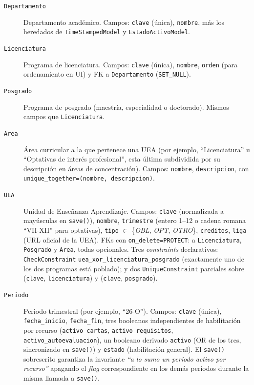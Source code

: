 \begin{description}
    \item[\texttt{Departamento}] Departamento académico. Campos: \texttt{clave} (única), \texttt{nombre}, más los heredados de \texttt{TimeStampedModel} y \texttt{EstadoActivoModel}.
    \item[\texttt{Licenciatura}] Programa de licenciatura. Campos: \texttt{clave} (única), \texttt{nombre}, \texttt{orden} (para ordenamiento en UI) y FK a \texttt{Departamento} (\texttt{SET\_NULL}).
    \item[\texttt{Posgrado}] Programa de posgrado (maestría, especialidad o doctorado). Mismos campos que \texttt{Licenciatura}.
    \item[\texttt{Area}] Área curricular a la que pertenece una UEA (por ejemplo, ``Licenciatura'' u ``Optativas de interés profesional'', esta última subdividida por su descripción en áreas de concentración). Campos: \texttt{nombre}, \texttt{descripcion}, con \texttt{unique\_together=(nombre, descripcion)}.
    \item[\texttt{UEA}] Unidad de Enseñanza-Aprendizaje. Campos: \texttt{clave} (normalizada a mayúsculas en \texttt{save()}), \texttt{nombre}, \texttt{trimestre} (entero 1--12 o cadena romana ``VII-XII'' para optativas), \texttt{tipo} $\in$ \{\emph{OBL}, \emph{OPT}, \emph{OTRO}\}, \texttt{creditos}, \texttt{liga} (URL oficial de la UEA). FKs con \texttt{on\_delete=PROTECT}: a \texttt{Licenciatura}, \texttt{Posgrado} y \texttt{Area}, todas opcionales. Tres \emph{constraints} declarativos: \texttt{CheckConstraint} \texttt{uea\_xor\_licenciatura\_posgrado} (exactamente uno de los dos programas está poblado); y dos \texttt{UniqueConstraint} parciales sobre (\texttt{clave}, \texttt{licenciatura}) y (\texttt{clave}, \texttt{posgrado}).
    \item[\texttt{Periodo}] Periodo trimestral (por ejemplo, ``26-O''). Campos: \texttt{clave} (única), \texttt{fecha\_inicio}, \texttt{fecha\_fin}, tres booleanos independientes de habilitación por recurso (\texttt{activo\_cartas}, \texttt{activo\_requisitos}, \texttt{activo\_autoevaluacion}), un booleano derivado \texttt{activo} (OR de los tres, sincronizado en \texttt{save()}) y \texttt{estado} (habilitación general). El \texttt{save()} sobrescrito garantiza la invariante \emph{``a lo sumo un periodo activo por recurso''} apagando el \emph{flag} correspondiente en los demás periodos durante la misma llamada a \texttt{save()}.
\end{description}

